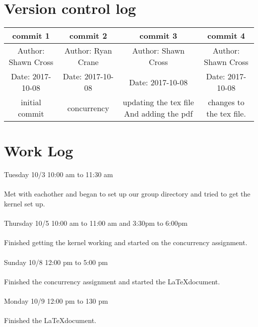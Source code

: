 \documentclass[letterpaper,10pt,titlepage]{article}
\begin{document}
\section{Version control log}
\begin{center}
   \begin{tabular}{ |c|c|c|c|}
      \hline
      commit 1&commit 2&commit 3&commit 4\\ 
      \hline
      Author: Shawn Cross &Author: Ryan Crane &Author: Shawn Cross &Author: Shawn Cross \\
      \hline
      Date:   2017-10-08&Date:   2017-10-08&Date:   2017-10-08&Date:   2017-10-08\\
      \hline
      initial commit&concurrency&updating the tex file And adding the pdf&changes to the tex file.\\
      \hline
   \end{tabular}
\end{center}

\section{Work Log}
Tuesday 10/3 10:00 am to 11:30 am\\\\
Met with eachother and began to set up our group directory and tried to
get the kernel set up.\\\\ 
Thursday 10/5 10:00 am to 11:00 am and 3:30pm to 6:00pm\\\\
Finished getting the kernel working and started on the concurrency assignment.\\\\
Sunday 10/8 12:00 pm to 5:00 pm \\\\
Finished the concurrency assignment and started the \LaTeX document.\\\\
Monday 10/9 12:00 pm to 130 pm \\\\
Finished the \LaTeX document.\\\\
%
\end{document}
